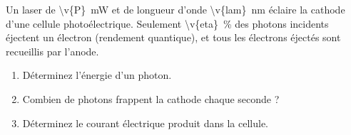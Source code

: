 Un laser de \qty{\v{P}}{mW} et de longueur d'onde \qty{\v{lam}}{nm} éclaire la cathode d'une cellule photoélectrique. Seulement \qty{\v{eta}}{\percent} des photons incidents éjectent un électron (rendement quantique), et tous les électrons éjectés sont recueillis par l'anode.

\begin{enumerate}[label=\alph*)]
    \item Déterminez l'énergie d'un photon.
    \item Combien de photons frappent la cathode chaque seconde ?
    \item Déterminez le courant électrique produit dans la cellule.
\end{enumerate}
